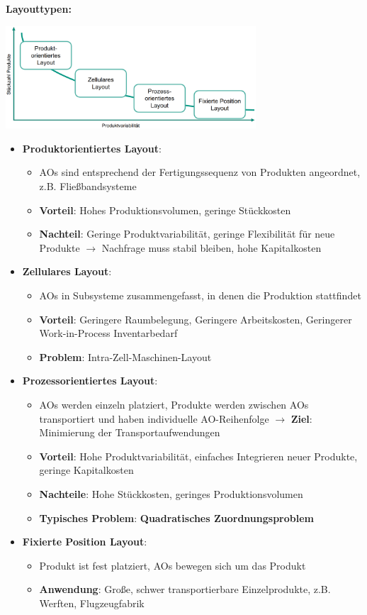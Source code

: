 \bigskip
\textbf{Layouttypen:}
\begin{center}
	\includegraphics[width=0.7\textwidth]{images/layout-types.png}
\end{center}
\begin{itemize}
	\item \textbf{Produktorientiertes Layout}:
	\begin{itemize}
		\item AOs sind entsprechend der Fertigungssequenz von Produkten angeordnet, z.B. Fließbandsysteme
		\item \textbf{Vorteil}: Hohes Produktionsvolumen, geringe Stückkosten
		\item \textbf{Nachteil}: Geringe Produktvariabilität, geringe Flexibilität für neue Produkte $\rightarrow$ Nachfrage muss stabil bleiben, hohe Kapitalkosten
	\end{itemize}
	\item \textbf{Zellulares Layout}:
	\begin{itemize}
		\item AOs in Subsysteme zusammengefasst, in denen die Produktion stattfindet
		\item \textbf{Vorteil}: Geringere Raumbelegung, Geringere Arbeitskosten, Geringerer Work-in-Process Inventarbedarf
		\item \textbf{Problem}: Intra-Zell-Maschinen-Layout
	\end{itemize}
	\item \textbf{Prozessorientiertes Layout}:
	\begin{itemize}
		\item AOs werden einzeln platziert, Produkte werden zwischen AOs transportiert
		und haben individuelle AO-Reihenfolge $\rightarrow$ \textbf{Ziel}: Minimierung der Transportaufwendungen
		\item \textbf{Vorteil}: Hohe Produktvariabilität, einfaches Integrieren neuer Produkte, geringe Kapitalkosten
		\item \textbf{Nachteile}: Hohe Stückkosten, geringes Produktionsvolumen
		\item \textbf{Typisches Problem}: \textbf{Quadratisches Zuordnungsproblem}
	\end{itemize}
	\item \textbf{Fixierte Position Layout}: 
	\begin{itemize}
		\item Produkt ist fest platziert, AOs bewegen sich um das Produkt
		\item \textbf{Anwendung}: Große, schwer transportierbare Einzelprodukte, z.B. Werften, Flugzeugfabrik
	\end{itemize}
\end{itemize}

